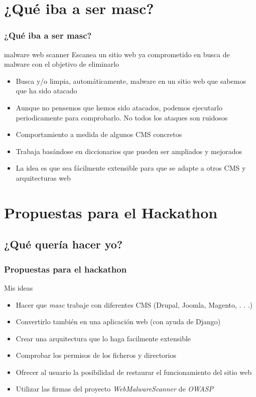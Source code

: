 \documentclass[xcolor={dvipsnames}]{beamer}
\begin{document}
\section{¿Qué iba a ser masc?} 
\begin{frame}\frametitle{¿Qué iba a ser masc?} 

    \begin{block}{malware web scanner}
    Escanea un sitio web ya comprometido en busca de malware con el objetivo de eliminarlo
    \end{block}

    \begin{itemize}
        \item Busca y/o limpia, automáticamente, malware en un sitio web que sabemos que ha sido atacado
        \item Aunque no pensemos que hemos sido atacados, podemos ejecutarlo periodicamente para comprobarlo. No todos los ataques son ruidosos
        \item Comportamiento a medida de algunos CMS concretos
        \item Trabaja basándose en diccionarios que pueden ser ampliados y mejorados
        \item La idea es que sea fácilmente extensible para que se adapte a otros CMS y arquitecturas web
    \end{itemize}
\end{frame}

\section{Propuestas para el Hackathon}
\subsection{¿Qué quería hacer yo?}
\begin{frame}\frametitle{Propuestas para el hackathon}
    \begin{block}{Mis ideas}
    \begin{itemize}
        \item Hacer que \emph{masc} trabaje con diferentes CMS (Drupal, Joomla, Magento, . . .)
        \item Convertirlo también en una aplicación web (con ayuda de Django)
        \item Crear una arquitectura que lo haga facilmente extensible
        \item Comprobar los permisos de los ficheros y directorios
        \item Ofrecer al usuario la posibilidad de restaurar el funcionamiento del sitio web
        \item Utilizar las firmas del proyecto \emph{WebMalwareScanner} de \emph{OWASP}
    \end{itemize}
    \end{block}
\end{frame}
\end{document}
